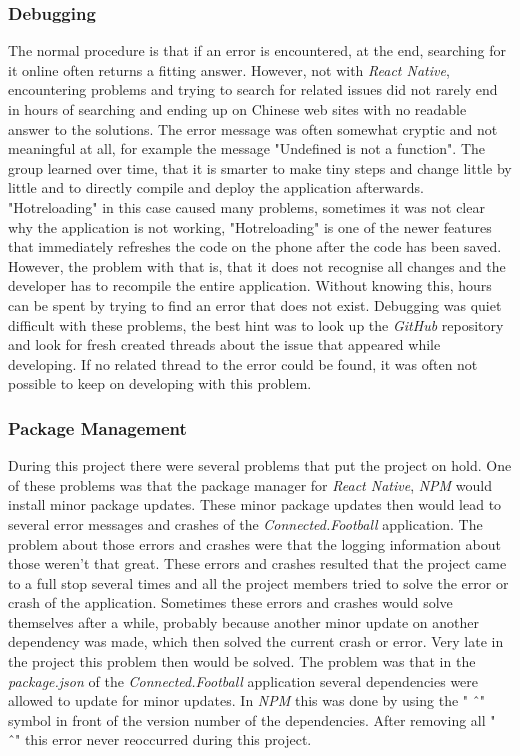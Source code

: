 \subsubsection{Debugging}
\label{sssec:debugging}

 The normal procedure is that if an error is encountered, at the end, searching for it online often returns a fitting answer. However, not with \textit{React Native}, encountering problems and trying to search for related issues did not rarely end in hours of searching and ending up on Chinese web sites with no readable answer to the solutions. The error message was often somewhat cryptic and not meaningful at all, for example the message "Undefined is not a function". The group learned over time, that it is smarter to make tiny steps and change little by little and to directly compile and deploy the application afterwards. "Hotreloading" in this case caused many problems, sometimes it was not clear why the application is not working, "Hotreloading" is one of the newer features that immediately refreshes the code on the phone after the code has been saved. However, the problem with that is, that it does not recognise all changes and the developer has to recompile the entire application. Without knowing this, hours can be spent by trying to find an error that does not exist.
 \newline
 Debugging was quiet difficult with these problems, the best hint was to look up the \textit{GitHub} repository and look for fresh created threads about the issue that appeared while developing. If no related thread to the error could be found, it was often not possible to keep on developing with this problem.

\subsubsection{Package Management}
\label{sssec:package_management}

During this project there were several problems that put the project on hold. One of these problems was that the package manager for \textit{React Native}, \textit{NPM} would install minor package updates. These minor package updates then would lead to several error messages and crashes of the \textit{Connected.Football} application. The problem about those errors and crashes were that the logging information about those weren't that great. These errors and crashes resulted that the project came to a full stop several times and all the project members tried to solve the error or crash of the application. 
\newline
Sometimes these errors and crashes would solve themselves after a while, probably because another minor update on another dependency was made, which then solved the current crash or error. 
\newline
Very late in the project this problem then would be solved. The problem was that in the \textit{package.json} of the \textit{Connected.Football} application several dependencies were allowed to update for minor updates. In \textit{NPM} this was done by using the " \^\ " symbol in front of the version number of the dependencies. After removing all " \^\ " this error never reoccurred during this project. 

